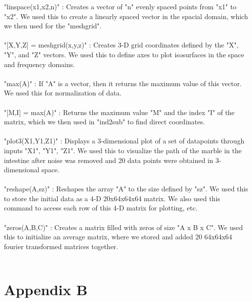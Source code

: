 \documentclass{article}
\begin{document}
"linspace(x1,x2,n)" : Creates a vector of "n" evenly spaced points from "x1" to "x2". We used this to create a linearly spaced vector in the spacial domain, which we then used for the "meshgrid".  \\ \\
"[X,Y,Z] = meshgrid(x,y,z)" : Creates 3-D grid coordinates defined by the "X", "Y", and "Z" vectors. We used this to define axes to plot isosurfaces in the space and frequency domains.\\ \\
"max(A)" : If "A" is a vector, then it returns the maximum value of this vector. We used this for normalization of data. \\ \\
"[M,I] = max(A)" : Returns the maximum value "M" and the index "I"  of the matrix, which we then used in "ind2sub" to find direct coordinates.  \\ \\
"plot3(X1,Y1,Z1)" : Displays a 3-dimensional plot of a set of datapoints through inputs "X1", "Y1", "Z1". We used this to visualize the path of the marble in the intestine after noise was removed and 20 data points were obtained in 3-dimensional space. \\ \\
"reshape(A,sz)" : Reshapes the array "A" to the size defined by "sz". We used this to store the initial data as a 4-D 20x64x64x64 matrix. We also used this command to access each row of this 4-D matrix for plotting, etc. \\ \\
"zeros(A,B,C)" : Creates a matrix filled with zeros of size "A x B x C". We used this to initialize an average matrix, where we stored and added 20 64x64x64 fourier transformed matrices together. \\ \\

\section*{\fontsize{19}{15}\selectfont Appendix B}
\end{document}
